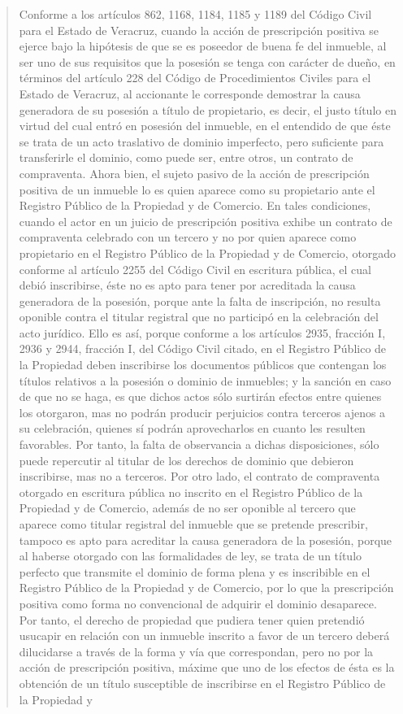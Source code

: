 \documentclass[11pt,a4paper]{article}
\begin{document}
\begin{quote}
Conforme a los artículos 862, 1168, 1184, 1185 y 1189 del Código Civil para el Estado de Veracruz,
cuando la acción de prescripción positiva se ejerce bajo la hipótesis de que se es poseedor de
buena fe del inmueble, al ser uno de sus requisitos que la posesión se tenga con carácter de dueño,
en términos del artículo 228 del Código de Procedimientos Civiles para el Estado de Veracruz, al
accionante le corresponde demostrar la causa generadora de su posesión a título de propietario, es
decir, el justo título en virtud del cual entró en posesión del inmueble, en el entendido de que éste se
trata de un acto traslativo de dominio imperfecto, pero suficiente para transferirle el dominio, como
puede ser, entre otros, un contrato de compraventa. Ahora bien, el sujeto pasivo de la acción de
prescripción positiva de un inmueble lo es quien aparece como su propietario ante el Registro
Público de la Propiedad y de Comercio. En tales condiciones, cuando el actor en un juicio de
prescripción positiva exhibe un contrato de compraventa celebrado con un tercero y no por quien
aparece como propietario en el Registro Público de la Propiedad y de Comercio, otorgado conforme
al artículo 2255 del Código Civil en escritura pública, el cual debió inscribirse, éste no es apto para
tener por acreditada la causa generadora de la posesión, porque ante la falta de inscripción, no
resulta oponible contra el titular registral que no participó en la celebración del acto jurídico. Ello es
así, porque conforme a los artículos 2935, fracción I, 2936 y 2944, fracción I, del Código Civil citado,
en el Registro Público de la Propiedad deben inscribirse los documentos públicos que contengan los
títulos relativos a la posesión o dominio de inmuebles; y la sanción en caso de que no se haga, es
que dichos actos sólo surtirán efectos entre quienes los otorgaron, mas no podrán producir
perjuicios contra terceros ajenos a su celebración, quienes sí podrán aprovecharlos en cuanto les
resulten favorables. Por tanto, la falta de observancia a dichas disposiciones, sólo puede repercutir
al titular de los derechos de dominio que debieron inscribirse, mas no a terceros. Por otro lado, el
contrato de compraventa otorgado en escritura pública no inscrito en el Registro Público de la
Propiedad y de Comercio, además de no ser oponible al tercero que aparece como titular registral
del inmueble que se pretende prescribir, tampoco es apto para acreditar la causa generadora de la
posesión, porque al haberse otorgado con las formalidades de ley, se trata de un título perfecto que
transmite el dominio de forma plena y es inscribible en el Registro Público de la Propiedad y de
Comercio, por lo que la prescripción positiva como forma no convencional de adquirir el dominio
desaparece. Por tanto, el derecho de propiedad que pudiera tener quien pretendió usucapir en
relación con un inmueble inscrito a favor de un tercero deberá dilucidarse a través de la forma y vía
que correspondan, pero no por la acción de prescripción positiva, máxime que uno de los efectos de
ésta es la obtención de un título susceptible de inscribirse en el Registro Público de la Propiedad y



\end{quote}
\end{document}
